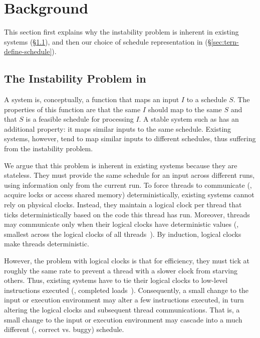 \section{Background}
\label{sec:background}

This section first explains why the instability
problem is inherent in existing \dmt systems (\S\ref{sec:dmt-background}),
and then our choice of schedule representation in \tern
(\S\ref{sec:tern-define-schedule}).

\subsection{The Instability Problem in \dmt} \label{sec:dmt-background}

A \dmt system is, conceptually, a function that maps an input $I$ to a
schedule $S$.  The properties of this function are that the same $I$
should map to the same $S$ and that $S$ is a feasible schedule for
processing $I$.  A stable \dmt system such as \tern has an additional
property: it maps similar inputs to the same schedule.  Existing \dmt
systems, however, tend to map similar inputs to different schedules, thus
suffering from the instability problem.  

We argue that this problem is inherent in existing \dmt systems because
they are stateless.  They must provide the same schedule for an input
across different runs, using information only from the current run.
To force threads to communicate (\eg, acquire locks or access shared memory)
deterministically, existing \dmt systems cannot rely on physical clocks. 
Instead, they
maintain a logical clock per thread that ticks deterministically based on
the code this thread has run.  Moreover, threads may communicate only when
their logical clocks have deterministic values (\eg, smallest across the
logical clocks of all threads~\cite{kendo:asplos09}).  By induction,
logical clocks make threads deterministic.

However, the problem with logical clocks is that for efficiency,
they must tick at
roughly the same rate to prevent a thread with a slower clock from
starving others.  Thus, existing \dmt systems have to tie their logical
clocks to low-level instructions executed (\eg, completed
loads~\cite{kendo:asplos09}).  Consequently, a small change to the input or
execution environment may alter a few instructions executed, in turn
altering the logical clocks and subsequent thread communications.  That is,
a small change to the input or execution environment may cascade into a
much different (\eg, correct vs. buggy) schedule.  


